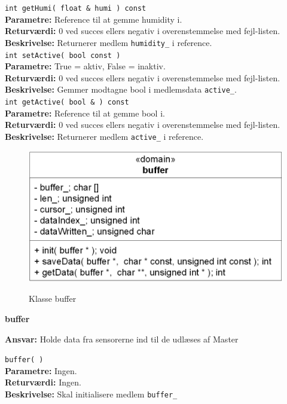 \verb+int getHumi( float & humi ) const+ \\
\textbf{Parametre:} Reference til at gemme humidity i. \\
\textbf{Returværdi:} 0 ved succes ellers negativ i overenstemmelse med fejl-listen. \\
\textbf{Beskrivelse:} Returnerer medlem \verb+humidity_+ i reference. \\

\verb+int setActive( bool const )+ \\
\textbf{Parametre:} True = aktiv, False = inaktiv. \\
\textbf{Returværdi:} 0 ved succes ellers negativ i overenstemmelse med fejl-listen. \\
\textbf{Beskrivelse:} Gemmer modtagne bool i medlemsdata \verb+active_+. \\

\verb+int getActive( bool & ) const+ \\
\textbf{Parametre:} Reference til at gemme bool i. \\
\textbf{Returværdi:} 0 ved succes ellers negativ i overenstemmelse med fejl-listen. \\
\textbf{Beskrivelse:} Returnerer medlem \verb+active_+ i reference. \\


\begin{figure}[htbp] \centering
{\includegraphics[scale=1.3]{filer/design/Klassediagrammer/sw_psoc_buffer}}
\caption{Klasse buffer}
\label{fig:sw_psoc_class_buffer}
\end{figure} 

{\centering
\textbf{buffer}\par
}
\textbf{Ansvar:} Holde data fra sensorerne ind til de udlæses af Master \

\verb+buffer( )+ \\
\textbf{Parametre:} Ingen. \\
\textbf{Returværdi:} Ingen. \\
\textbf{Beskrivelse:} Skal initialisere medlem \verb+buffer_+\\

